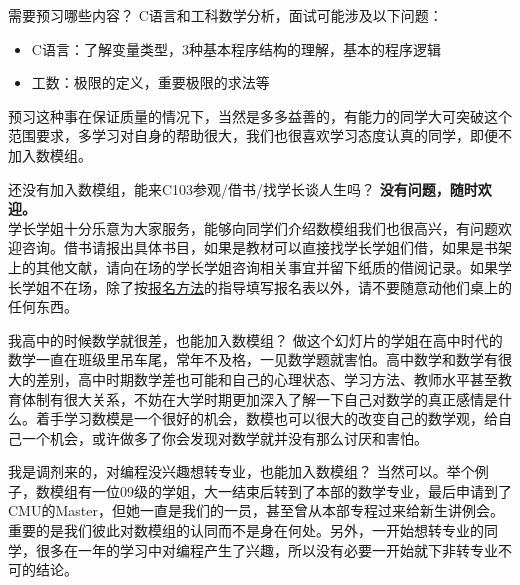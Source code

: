 \documentclass{beamer}
\begin{document}
\begin{frame}
\begin{alertblock}{需要预习哪些内容？}
C语言和工科数学分析，面试可能涉及以下问题：
\begin{itemize}
    \item C语言：了解变量类型，3种基本程序结构的理解，基本的程序逻辑
    \item 工数：极限的定义，重要极限的求法等
\end{itemize}
预习这种事在保证质量的情况下，当然是多多益善的，有能力的同学大可突破这个范围要求，多学习对自身的帮助很大，我们也很喜欢学习态度认真的同学，即便不加入数模组。
\end{alertblock}

\begin{block}{还没有加入数模组，能来C103参观/借书/找学长谈人生吗？}
\textbf{没有问题，随时欢迎。}\\
学长学姐十分乐意为大家服务，能够向同学们介绍数模组我们也很高兴，有问题欢迎咨询。借书请报出具体书目，如果是教材可以直接找学长学姐们借，如果是书架上的其他文献，请向在场的学长学姐咨询相关事宜并留下纸质的借阅记录。如果学长学姐不在场，除了按\textcolor{blue}{\hyperlink{signin}{报名方法}}的指导填写报名表以外，请不要随意动他们桌上的任何东西。

\end{block}
\end{frame}

\begin{frame}
\begin{block}{我高中的时候数学就很差，也能加入数模组？}
做这个幻灯片的学姐在高中时代的数学一直在班级里吊车尾，常年不及格，一见数学题就害怕。高中数学和数学有很大的差别，高中时期数学差也可能和自己的心理状态、学习方法、教师水平甚至教育体制有很大关系，不妨在大学时期更加深入了解一下自己对数学的真正感情是什么。着手学习数模是一个很好的机会，数模也可以很大的改变自己的数学观，给自己一个机会，或许做多了你会发现对数学就并没有那么讨厌和害怕。
\end{block}
\begin{alertblock}{我是调剂来的，对编程没兴趣想转专业，也能加入数模组？}
当然可以。举个例子，数模组有一位09级的学姐，大一结束后转到了本部的数学专业，最后申请到了CMU的Master，但她一直是我们的一员，甚至曾从本部专程过来给新生讲例会。重要的是我们彼此对数模组的认同而不是身在何处。另外，一开始想转专业的同学，很多在一年的学习中对编程产生了兴趣，所以没有必要一开始就下非转专业不可的结论。
\end{alertblock}
\end{frame}
\end{document}
